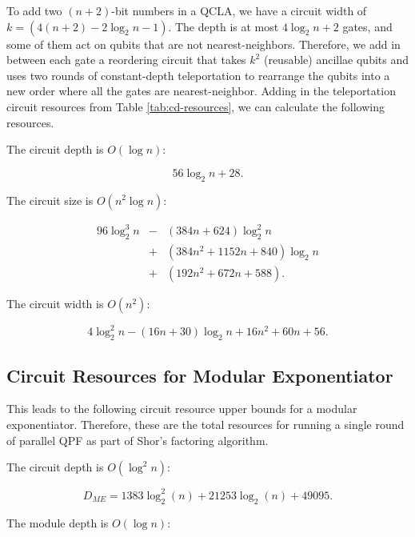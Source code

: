 To add two $(n+2)$-bit numbers in a QCLA, we have a circuit width of
$k = (4(n+2) - 2\log_2 n - 1)$. The depth is at most $4\log_2 n +2$ gates,
and some of them act on qubits that are not nearest-neighbors. Therefore,
we add in between each gate a reordering circuit that takes $k^2$
(reusable) ancillae
qubits and uses two rounds of constant-depth teleportation to rearrange
the qubits into a new order where all the gates are nearest-neighbor.
Adding in the teleportation circuit resources from Table \ref{tab:cd-resources},
we can calculate the following resources.

The circuit depth is $O(\log n)$:

\begin{equation}
56\log_2 n + 28\text{.}
\end{equation}

The circuit size is $O(n^2 \log n)$:

\begin{eqnarray}
96 \log_2^3 n & - & (384n + 624)\log_2^2 n \nonumber \\
              & + & (384n^2 + 1152n + 840) \log_2 n \nonumber \\
              & + & (192n^2 + 672n + 588)\text{.}
\end{eqnarray}

The circuit width is $O(n^2)$:

\begin{equation}
4 \log_2^2 n - (16n + 30)\log_2 n + 16n^2 + 60n + 56\text{.}
\end{equation}


\subsection{Circuit Resources for Modular Exponentiator}
\label{subsec:modexp-resources}

This leads to the following circuit resource upper bounds for a modular exponentiator. Therefore, these are the total resources for running a
single round of parallel QPF as part of Shor's factoring algorithm.

The circuit depth is $O(\log^2 n)$:

\begin{equation}
D_{ME} = 1383\log_2^2(n) + 21253\log_2(n) + 49095\text{.}
\end{equation}

The module depth is $O(\log n)$:

